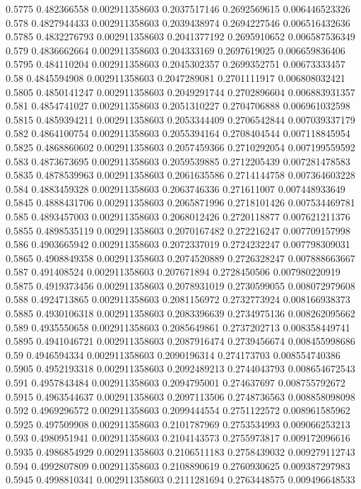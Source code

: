 {0.5775 0.482366558 0.002911358603 0.2037517146 0.2692569615 0.006446523326
0.578 0.4827944433 0.002911358603 0.2039438974 0.2694227546 0.006516432636
0.5785 0.4832276793 0.002911358603 0.2041377192 0.2695910652 0.006587536349
0.579 0.4836662664 0.002911358603 0.204333169 0.2697619025 0.006659836406
0.5795 0.484110204 0.002911358603 0.2045302357 0.2699352751 0.00673333457
0.58 0.4845594908 0.002911358603 0.2047289081 0.2701111917 0.006808032421
0.5805 0.4850141247 0.002911358603 0.2049291744 0.2702896604 0.006883931357
0.581 0.4854741027 0.002911358603 0.2051310227 0.2704706888 0.006961032598
0.5815 0.4859394211 0.002911358603 0.2053344409 0.2706542844 0.007039337179
0.582 0.4864100754 0.002911358603 0.2055394164 0.2708404544 0.007118845954
0.5825 0.4868860602 0.002911358603 0.2057459366 0.2710292054 0.007199559592
0.583 0.4873673695 0.002911358603 0.2059539885 0.2712205439 0.007281478583
0.5835 0.4878539963 0.002911358603 0.2061635586 0.2714144758 0.007364603228
0.584 0.4883459328 0.002911358603 0.2063746336 0.271611007 0.007448933649
0.5845 0.4888431706 0.002911358603 0.2065871996 0.2718101426 0.007534469781
0.585 0.4893457003 0.002911358603 0.2068012426 0.2720118877 0.007621211376
0.5855 0.4898535119 0.002911358603 0.2070167482 0.272216247 0.007709157998
0.586 0.4903665942 0.002911358603 0.2072337019 0.2724232247 0.007798309031
0.5865 0.4908849358 0.002911358603 0.2074520889 0.2726328247 0.007888663667
0.587 0.491408524 0.002911358603 0.207671894 0.2728450506 0.007980220919
0.5875 0.4919373456 0.002911358603 0.2078931019 0.2730599055 0.008072979608
0.588 0.4924713865 0.002911358603 0.2081156972 0.2732773924 0.008166938373
0.5885 0.4930106318 0.002911358603 0.2083396639 0.2734975136 0.008262095662
0.589 0.4935550658 0.002911358603 0.2085649861 0.2737202713 0.008358449741
0.5895 0.4941046721 0.002911358603 0.2087916474 0.2739456674 0.008455998686
0.59 0.4946594334 0.002911358603 0.2090196314 0.274173703 0.008554740386
0.5905 0.4952193318 0.002911358603 0.2092489213 0.2744043793 0.008654672543
0.591 0.4957843484 0.002911358603 0.2094795001 0.274637697 0.008755792672
0.5915 0.4963544637 0.002911358603 0.2097113506 0.2748736563 0.008858098098
0.592 0.4969296572 0.002911358603 0.2099444554 0.2751122572 0.008961585962
0.5925 0.497509908 0.002911358603 0.2101787969 0.2753534993 0.009066253213
0.593 0.4980951941 0.002911358603 0.2104143573 0.2755973817 0.009172096616
0.5935 0.4986854929 0.002911358603 0.2106511183 0.2758439032 0.009279112743
0.594 0.4992807809 0.002911358603 0.2108890619 0.2760930625 0.009387297983
0.5945 0.4998810341 0.002911358603 0.2111281694 0.2763448575 0.009496648533
}
